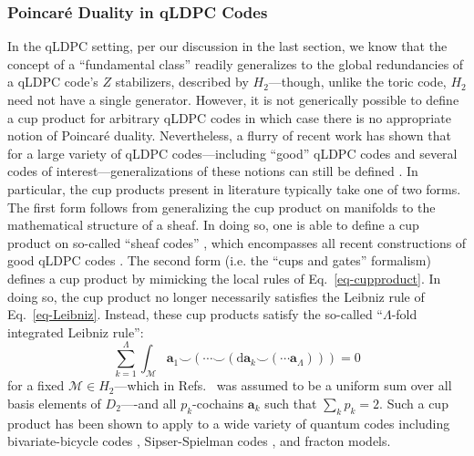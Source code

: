 \documentclass[aps,prx,reprint,superscriptaddress,nofootinbib]{revtex4-2}
\theoremstyle{definition}
\newcommand{\cupp}{\smallsmile}
\newcommand{\exd}{\text{d}}
\newcommand{\<}{\langle}
\renewcommand{\>}{\rangle}
\begin{document}
\subsubsection{Poincar\'e Duality in qLDPC Codes}\label{Sec:PD_LDPC}

In the qLDPC setting, per our discussion in the last section, we know that the concept of a ``fundamental class'' readily generalizes to the global redundancies of a qLDPC code's $Z$ stabilizers, described by $H_2$---though, unlike the toric code, $H_2$ need not have a single generator.
%
However, it is not generically possible to define a cup product for arbitrary qLDPC codes in which case there is no appropriate notion of Poincar\'e duality.
%
Nevertheless, a flurry of recent work has shown that for a large variety of qLDPC codes---including ``good'' qLDPC codes and several codes of interest---generalizations of these notions can still be defined \cite{breuckmann2025cupsgatesicohomology, lin2024transversalnoncliffordgatesquantum,zhu2025topological, menon2025magic, li_poincare_2025}. 
%
In particular, the cup products present in literature typically take one of two forms.
%
The first form follows from generalizing the cup product on manifolds to the mathematical structure of a sheaf.
%
In doing so, one is able to define a cup product on so-called ``sheaf codes'' \cite{first2024good2querylocallytestable, panteleev2024maximallyextendablesheafcodes}, which encompasses all recent constructions of good qLDPC codes \cite{lin2024transversalnoncliffordgatesquantum, li_poincare_2025}.
%
The second form (i.e. the ``cups and gates'' formalism) defines a cup product by mimicking the local rules of Eq.~\eqref{eq-cupproduct}.
%
In doing so, the cup product no longer necessarily satisfies the Leibniz rule of Eq.~\eqref{eq-Leibniz}.
%
Instead, these cup products satisfy the so-called ``$\Lambda$-fold integrated Leibniz rule'': 
\begin{equation}
    \sum_{k = 1}^{\Lambda} \int_{\mathcal{M}} \mathbf{a}_1 \cupp\left( \cdots \cupp (\exd \mathbf{a}_k \cupp ( \cdots  \mathbf{a}_{\Lambda} ))\right) = 0 
\end{equation}
for a fixed $\mathcal{M} \in H_2$---which in Refs.~\cite{breuckmann2025cupsgatesicohomology, menon2025magic} was assumed to be a uniform sum over all basis elements of $D_2$----and all $p_k$-cochains $\mathbf{a}_k$ such that $\sum_k p_k = 2$.
%
Such a cup product has been shown to apply to a wide variety of quantum codes including  bivariate-bicycle codes \cite{Bravyi_2024}, Sipser-Spielman codes \cite{SipserSpiel}, and fracton models.
%
\end{document}
